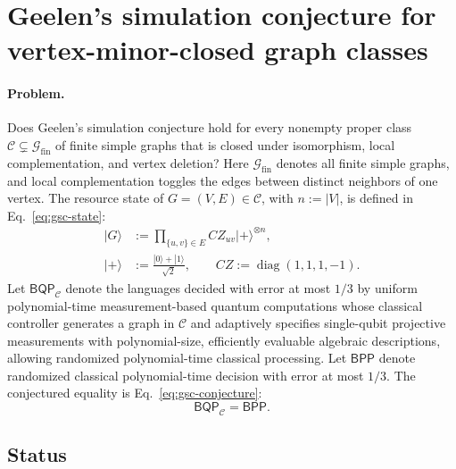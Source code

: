 \section{Geelen's simulation conjecture for vertex-minor-closed graph classes}
\label{sec:op_1726fa212d725bc8}

\paragraph{Problem.}
Does Geelen's simulation conjecture hold for every nonempty proper class $\mathcal C\subsetneq\mathcal G_{\mathrm{fin}}$ of finite simple graphs that is closed under isomorphism, local complementation, and vertex deletion? Here $\mathcal G_{\mathrm{fin}}$ denotes all finite simple graphs, and local complementation toggles the edges between distinct neighbors of one vertex. The resource state of $G=(V,E)\in\mathcal C$, with $n:=|V|$, is defined in Eq.~\eqref{eq:gsc-state}:
\begin{equation}
\begin{aligned}
|G\rangle&:=\prod_{\{u,v\}\in E}CZ_{uv}|+\rangle^{\otimes n},\\
|+\rangle&:=\frac{|0\rangle+|1\rangle}{\sqrt2},
\qquad CZ:=\operatorname{diag}(1,1,1,-1).
\end{aligned}
\label{eq:gsc-state}
\end{equation}
Let $\mathsf{BQP}_{\mathcal C}$ denote the languages decided with error at most $1/3$ by uniform polynomial-time measurement-based quantum computations whose classical controller generates a graph in $\mathcal C$ and adaptively specifies single-qubit projective measurements with polynomial-size, efficiently evaluable algebraic descriptions, allowing randomized polynomial-time classical processing. Let $\mathsf{BPP}$ denote randomized classical polynomial-time decision with error at most $1/3$. The conjectured equality is Eq.~\eqref{eq:gsc-conjecture}:
\begin{equation}
\mathsf{BQP}_{\mathcal C}=\mathsf{BPP}.
\label{eq:gsc-conjecture}
\end{equation}

\subsection*{Status}

